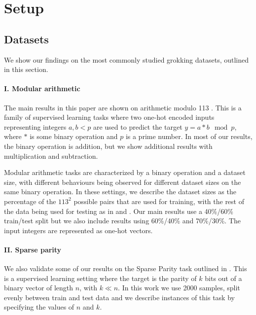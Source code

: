 \section{Setup}
\subsection{Datasets}

We show our findings on the most commonly studied grokking datasets, outlined in this section.

\begin{comment}
    \begin{enumerate}[itemsep=1mm,topsep=0mm,leftmargin=*]
    \item[\textbf{I. Modular Arithmetic}] 
\end{enumerate}
\end{comment}


\paragraph{I. Modular arithmetic}
The main results in this paper are shown on arithmetic modulo 113 \citep{power2022grokking, Nanda2023-hf}. This is a family of supervised learning tasks where two one-hot encoded inputs representing integers $a,b < p$ are used to predict the target $y=a*b \mod p$, where $*$ is some binary operation and $p$ is a prime number. In most of our results, the binary operation is addition, but we show additional results with multiplication and subtraction. 

Modular arithmetic tasks are characterized by a binary operation and a dataset size, with different behaviours being observed for different dataset sizes on the same binary operation. In these settings, we describe the dataset sizes as the percentage of the $113^2$ possible pairs that are used for training, with the rest of the data being used for testing as in \cite{Nanda2023-hf} and \cite{power2022grokking}. Our main results use a 40\%/60\% train/test split but we also include results using 60\%/40\% and 70\%/30\%. The input integers are represented as one-hot vectors. 

\paragraph{II. Sparse parity}
We also validate some of our results on the Sparse Parity task outlined in \cite{Barak2022-el}. This is a supervised learning setting where the target is the parity of $k$ bits out of a binary vector of length $n$, with $k\ll n$. In this work we use 2000 samples, split evenly between train and test data and we describe instances of this task by specifying the values of $n$ and $k$.

